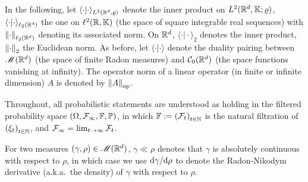 In the following, let $\langle \cdot\vert\cdot\rangle_{L^2(\mathbb{R}^d,\varrho)}$ denote the inner product on $L^2(\mathbb{R}^d,\mathbb{K};\varrho)$, $\langle\cdot\vert\cdot\rangle_{\ell_2(\mathbb{R}^d)}$ the one on $\ell^2(\mathbb{R},\mathbb{K})$ (the space of square integrable real sequences) with $\left\lVert\cdot\right\rVert_{\ell_2(\mathbb{R}^d)}$ denoting its associated norm. On $\mathbb{R}^d$, $\langle\cdot\vert\cdot\rangle_{2}$ denotes the inner product, $\left\lVert\cdot\right\rVert_2$ the Euclidean norm. As before, let  $\langle\cdot\vert\cdot\rangle$ denote the duality pairing between $\mathscr{M}(\mathbb{R}^d)$ (the space of finite Radon measures) and $\mathcal{C}_0(\mathbb{R}^d)$ (the space functions vanishing at infinity). The operator norm of a linear operator (in finite or infinite dimension) $A$ is denoted by $\left\lVert A\right\rVert_{{\rm op}}$.

Throughout, all probabilistic statements are understood as holding in the filtered probability space $(\Omega,\mathcal{F}_\infty,\mathbb{F},\mathbb{P})$, in which $\mathbb{F}:={(\mathcal{F}_t)}_{t\in\mathbb{N}}$ is the natural filtration of ${(\xi_t)}_{t\in\mathbb{N}}$, and $\mathcal{F}_\infty=\lim_{t\to\infty}\mathcal{F}_t$.

For two measures $(\gamma,\rho)\in\mathscr{M}(\mathbb{R}^d)$, $\gamma\ll\rho$ denotes that $\gamma$ is absolutely continuous with respect to $\rho$, in which case we use ${\mathrm{d} \gamma}/{\mathrm{d} \rho}$ to denote the Radon-Nikodym derivative (a.k.a.\ the density) of $\gamma$ with respect to $\rho$.